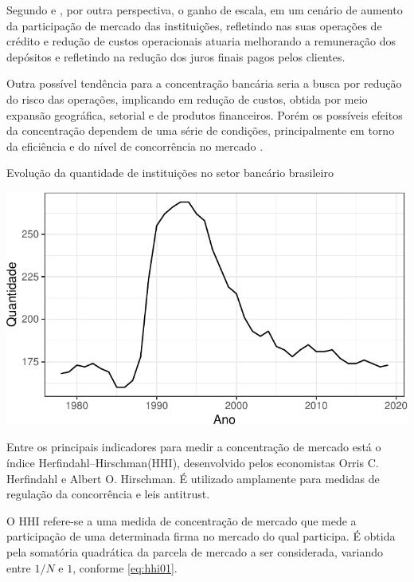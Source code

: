 \documentclass[
  12pt,
  12pt,
  openright,
  oneside,
  a4paper,
  chapter=TITLE,
  section=TITLE,
  subsection=TITLE,
  subsubsection=TITLE,
  portugues,
  sumario=tradicional]{abntex2}
\begin{document}
Segundo \textcite{camargo:2009} e \textcite{dantas:2012}, por outra perspectiva, o ganho de escala, em um cenário de aumento da participação de mercado das instituições, refletindo nas suas operações de crédito e redução de custos operacionais atuaria melhorando a remuneração dos depósitos e refletindo na redução dos juros finais pagos pelos clientes.

Outra possível tendência para a concentração bancária seria a busca por redução do risco das operações, implicando em redução de custos, obtida por meio expansão geográfica, setorial e de produtos financeiros. Porém os possíveis efeitos da concentração dependem de uma série de condições, principalmente em torno da eficiência e do nível de concorrência no mercado \cite{camargo:2009}.

\begin{grafico}[!hbtp]
\vspace{20pt}
\caption{Evolução da quantidade de instituições no setor bancário brasileiro}
\vspace{-4mm}

\begin{center}\includegraphics{12-exportedfigures/concetration-1} \end{center}
\vspace{-3mm}
\label{graf:concentracao}
\vspace{-2mm}
\end{grafico}

Entre os principais indicadores para medir a concentração de mercado está o índice Herfindahl--Hirschman(HHI), desenvolvido pelos economistas Orris C. Herfindahl e Albert O. Hirschman. É utilizado amplamente para medidas de regulação da concorrência e leis antitrust.

O HHI refere-se a uma medida de concentração de mercado que mede a participação de uma determinada firma no mercado do qual participa. É obtida pela somatória quadrática da parcela de mercado a ser considerada, variando entre \(1/N\) e \(1\), conforme \autoref{eq:hhi01}.
\end{document}
